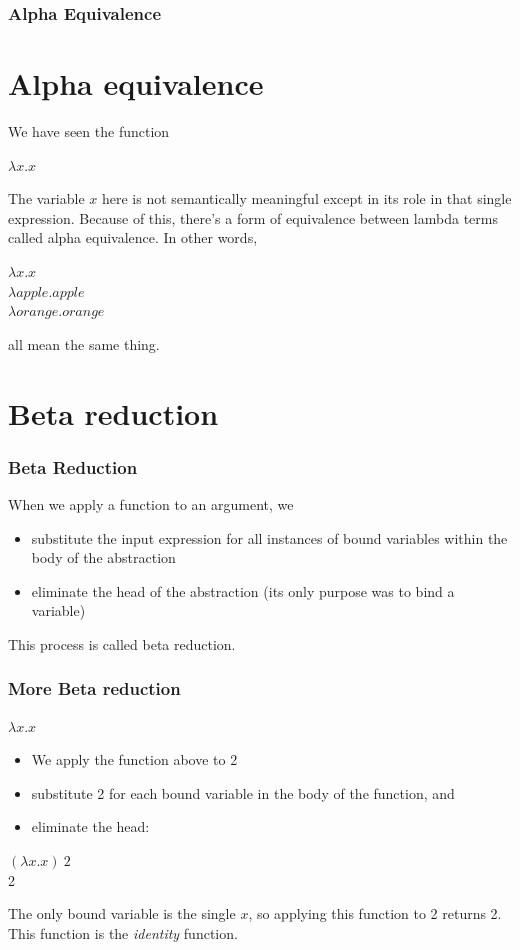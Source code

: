\documentclass{beamer}
\begin{document}
\begin{frame}
\frametitle{Alpha Equivalence}

\section{Alpha equivalence}

We have seen the function
\begin{center}
$\lambda x.x$
\end{center}
The variable $x$ here is not semantically meaningful except in its role in that single expression. Because of this, there’s a form of equivalence between lambda terms called alpha equivalence. In other words, 
\begin{center}
$\lambda x.x$ \\

$\lambda apple.apple$\\

$\lambda orange.orange$\\
\end{center}
all mean the same thing. 
\end{frame}
\section{Beta reduction}
\begin{frame} [fragile, label = test]
    \frametitle{Beta Reduction}

When we apply a function to an argument, we 
\begin{itemize}
\item substitute the input expression for all instances of bound variables within the body of the abstraction
\item eliminate the head of the abstraction (its only purpose was to bind a variable)
\end{itemize}
This process is called beta reduction.

\end{frame}

\begin{frame} [fragile, label = test]
    \frametitle{More Beta reduction}
  
   \begin{center}
   $\lambda x.x$
   \end{center}
   \pause
   \begin{itemize}
   \item We apply the function above to 2
   \pause
   \item substitute 2 for each bound variable in the body of the function, and 
   \pause
   \item eliminate the head:
   \end{itemize}
   \begin{center}
    \pause
   $(\lambda x.x) \ 2  $ \\
   
   \hspace*{.5in}2
   \end{center}
   \pause
   The only bound variable is the single $x$, so applying this function to 2 returns 2. This function is the \textit{identity} function.

   \end{frame}
\end{document}
